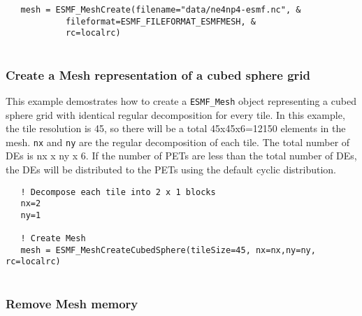  \begin{verbatim}
   mesh = ESMF_MeshCreate(filename="data/ne4np4-esmf.nc", &
            fileformat=ESMF_FILEFORMAT_ESMFMESH, &
            rc=localrc)
 
\end{verbatim}
 

  \subsubsection{Create a Mesh representation of a cubed sphere grid}
  \label{sec:example:MeshCubedSphere}
  
  This example demostrates how to create a {\tt ESMF\_Mesh} object representing a cubed sphere grid with
  identical regular decomposition for every tile. 
  In this example, the tile resolution is 45, so there will be a total 45x45x6=12150 elements in the mesh.
  {\tt nx} and {\tt ny} are the regular decomposition of each tile.  
  The total number of DEs is nx x ny x 6. If the number of PETs are less than the total
  number of DEs, the DEs will be distributed to the PETs using the default cyclic distribution. 

 \begin{verbatim}
   ! Decompose each tile into 2 x 1 blocks
   nx=2
   ny=1

   ! Create Mesh
   mesh = ESMF_MeshCreateCubedSphere(tileSize=45, nx=nx,ny=ny, rc=localrc)
 
\end{verbatim}
 

  \subsubsection{Remove Mesh memory}
  
